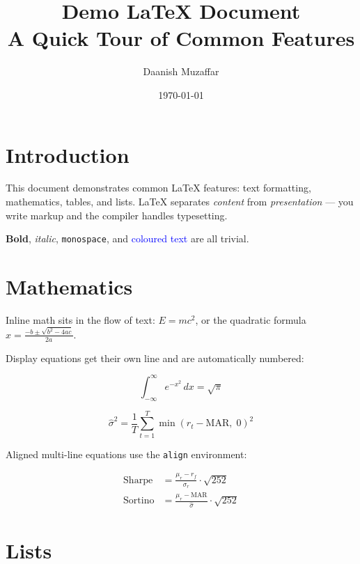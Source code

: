 \documentclass[12pt, a4paper]{article}
\title{\textbf{Demo \LaTeX{} Document} \\ \large A Quick Tour of Common Features}
\author{Daanish Muzaffar}
\date{\today}
\begin{document}
\maketitle
\tableofcontents
\newpage

\section{Introduction}

This document demonstrates common \LaTeX{} features: text formatting,
mathematics, tables, and lists. \LaTeX{} separates \textit{content} from
\textit{presentation} --- you write markup and the compiler handles typesetting.

\textbf{Bold}, \textit{italic}, \texttt{monospace}, and
\textcolor{blue}{coloured text} are all trivial.

\section{Mathematics}

Inline math sits in the flow of text: $E = mc^2$, or the quadratic formula
$x = \frac{-b \pm \sqrt{b^2 - 4ac}}{2a}$.

Display equations get their own line and are automatically numbered:

\begin{equation}
    \int_{-\infty}^{\infty} e^{-x^2}\, dx = \sqrt{\pi}
\end{equation}

\begin{equation}
    \hat{\sigma}^2 = \frac{1}{T} \sum_{t=1}^{T} \min(r_t - \text{MAR},\; 0)^2
\end{equation}

Aligned multi-line equations use the \texttt{align} environment:

\begin{align}
    \text{Sharpe}  &= \frac{\mu_r - r_f}{\sigma_r} \cdot \sqrt{252} \\[4pt]
    \text{Sortino} &= \frac{\mu_r - \text{MAR}}{\hat{\sigma}} \cdot \sqrt{252}
\end{align}

\section{Lists}
\end{document}
